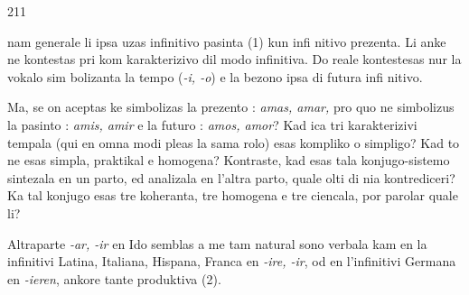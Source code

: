 \begin{VUpage}[215]{211}

\VUcontinue
nam generale li ipsa uzas infinitivo pasinta (1) kun infi\cc
nitivo prezenta. Li anke ne kontestas pri  kom karakterizivo\nl
dil modo infinitiva. Do reale kontestesas nur la vokalo sim\cc
bolizanta la tempo (\textit{-i, -o}) e la bezono ipsa di futura infi\cc
nitivo.

Ma, se on aceptas ke  simbolizas la prezento : \textit{amas, amar,}\nl
pro quo  ne simbolizus la pasinto : \textit{amis, amir} e  la futuro :\nl
\textit{amos, amor}? Kad ica tri karakterizivi tempala (qui en omna\nl
modi pleas la sama rolo) esas kompliko o simpligo? Kad to\nl
ne esas simpla, praktikal e homogena? Kontraste, kad esas\nl
tala konjugo-sistemo sintezala en un parto, ed analizala en\nl
l'altra parto, quale olti di nia kontrediceri? Ka tal konjugo\nl
esas tre koheranta, tre homogena e tre ciencala, por parolar\nl
quale li?

Altraparte \textit{-ar, -ir} en Ido semblas a me tam natural sono\nl
verbala kam en la infinitivi Latina, Italiana, Hispana,\nl
Franca en \textit{-ire, -ir}, od en l'infinitivi Germana en \textit{-ieren},\nl
ankore tante produktiva (2).


\end{VUpage}
